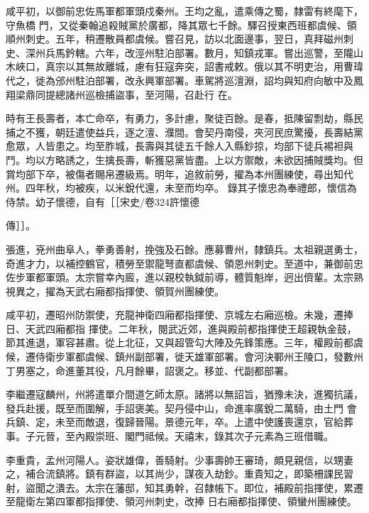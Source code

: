 \begin{pinyinscope}
 咸平初，以御前忠佐馬軍都軍頭戍秦州。王均之亂，遣乘傳之蜀，隸雷有終麾下，守魚橋
 門，又從秦翰追殺賊黨於廣都，降其眾七千餘。驛召授東西班都虞候、領順州刺史。五年，稍遷散員都虞候。嘗召見，訪以北面邊事，翌日，真拜磁州刺史、深州兵馬鈐轄。六年，改涇州駐泊部署。數月，知鎮戎軍。嘗出巡警，至隴山木峽口，真宗以其無故離城，慮有狂寇奔突，詔書戒敕。俄以其不明吏治，用曹瑋代之，徙為邠州駐泊部署，改永興軍部署。車駕將巡澶淵，詔均與知府向敏中及鳳翔梁鼎同提總諸州巡檢捕盜事，至河陽，召赴行
 在。



 時有王長壽者，本亡命卒，有勇力，多計慮，聚徒百餘。是春，抵陳留剽劫，縣民捕之不獲，朝廷遣使益兵，逐之澶、濮間。會契丹南侵，夾河民庶驚擾，長壽結黨愈眾，人皆患之。均至胙城，長壽與其徒五千餘人入縣鈔掠，均部下徒兵裼袒與鬥。均以方略誘之，生擒長壽，斬獲惡黨皆盡。上以方禦敵，未欲因捕賊獎均。但賞均部下卒，被傷者賜帛遷級焉。明年，追敘前勞，擢為本州團練使，尋出知代州。四年秋，均被疾，以米銳代還，未至而均卒。
 錄其子懷忠為奉禮郎，懷信為侍禁。幼子懷德，自有［［宋史/卷324許懷德
 
 傳］］。



 張進，兗州曲阜人，拳勇善射，挽強及石餘。應募曹州，隸鎮兵。太祖親選勇士，奇進才力，以補控鶴官，積勞至禦龍弩直都虞候、領恩州刺史。至道中，兼御前忠佐步軍都軍頭。太宗嘗幸內廄，進以親校執鉞前導，體質魁岸，迥出儕輩。太宗熟視異之，擢為天武右廂都指揮使、領賀州團練使。



 咸平初，遷昭州防禦使，充龍神衛四廂都指揮使、京城左右廂巡檢。未幾，遷捧日、天武四廂都指
 揮使。二年秋，閱武近郊，進與殿前都指揮使王超親執金鼓，節其進退，軍容甚肅。從上北征，又與超管勾大陣及先鋒策應。三年，權殿前都虞候，遷侍衛步軍都虞候、鎮州副部署，徙天雄軍部署。會河決鄆州王陵口，發數州丁男塞之，命進董其役，凡月餘畢，詔褒之。移並、代副都部署。



 李繼遷寇麟州，州將遣單介間道乞師太原。諸將以無詔旨，猶豫未決，進獨抗議，發兵赴援，既至而圍解，手詔褒美。契丹侵中山，命進率廣銳二萬騎，由土門
 會兵鎮、定，未至而敵退，復歸晉陽。景德元年，卒。上遣中使護喪還京，官給葬事。子元晉，至內殿崇班、閣門祗候。天禧末，錄其次子元素為三班借職。



 李重貴，孟州河陽人。姿狀雄偉，善騎射。少事壽帥王審琦，頗見親信，以甥妻之，補合流鎮將。鎮有群盜，以其尚少，謀夜入劫鈔。重貴知之，即築柵課民習射，盜聞之潰去。太宗在藩邸，知其勇幹，召隸帳下。即位，補殿前指揮使，累遷至龍衛左第四軍都指揮使、領河州刺史，改捧
 日右廂都指揮使、領蠻州團練使。




\end{pinyinscope}
